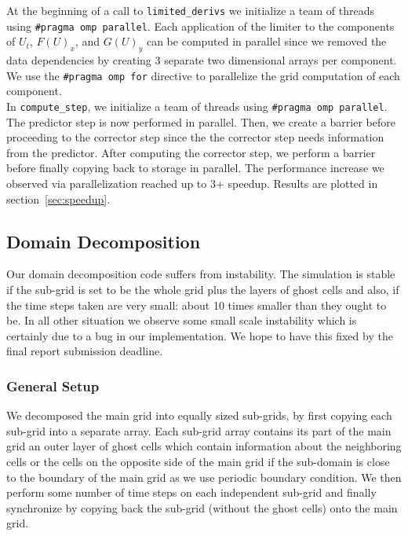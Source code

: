 \documentclass[11pt]{article}
\begin{document}
At the beginning of a call to \texttt{limited\_derivs} we initialize a team of threads using \texttt{\#pragma omp parallel}. Each application of the limiter to the components of $U_t$, $F(U)_x$, and $G(U)_y$ can be computed in parallel since we removed the data dependencies by creating 3 separate two dimensional arrays per component. We use the \texttt{\#pragma omp for} directive to parallelize the grid computation of each component. \\

In \texttt{compute\_step}, we initialize a team of threads using \texttt{\#pragma omp parallel}. The predictor step is now performed in parallel. Then, we create a barrier before proceeding to the corrector step since the the corrector step needs information from the predictor. After computing the corrector step, we perform a barrier before finally copying back to storage in parallel. The performance increase we observed via parallelization reached up to 3+ speedup. Results are plotted in section~\ref{sec:speedup}.


\subsection{Domain Decomposition}

Our domain decomposition code suffers from instability. The simulation is stable if the sub-grid is set to be the whole grid plus the layers of ghost cells and also, if the time steps taken are very small: about 10 times smaller than they ought to be. In all other situation we observe some small scale instability which is certainly due to a bug in our implementation. We hope to have this fixed by the final report submission deadline.

\subsubsection{General Setup}
We decomposed the main grid into equally sized sub-grids, by first copying  each sub-grid into a separate array. Each sub-grid array contains its part of the main grid an outer layer of ghost cells which contain information about the neighboring cells or the cells on the opposite side of the main grid if the sub-domain is close to the boundary of the main grid as we use periodic boundary condition. We then perform some number of time steps on each independent sub-grid and finally synchronize by copying back the sub-grid (without the ghost cells) onto the main grid. 
\end{document}

